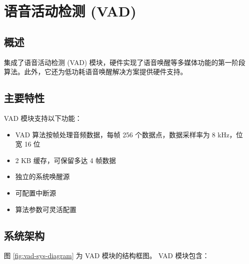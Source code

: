 \documentclass[main\_\_CN.tex]{subfiles}
\begin{document}

\ifglobal
\else
    {\let\clearpage\relax \listoftodos}
    {\let\clearpage\relax \listofdonetodos}
    \tableofcontents
\fi



\hypertarget{vad}{}
\chapter{语音活动检测 (VAD)}
\label{mod:vad}

\section{概述}
\chipname{} 集成了语音活动检测 (VAD) 模块，硬件实现了语音唤醒等多媒体功能的第一阶段算法。此外，它还为低功耗语音唤醒解决方案提供硬件支持。

\section{主要特性}
\label{sec:vad-features}

VAD 模块支持以下功能：

\begin{itemize}
    \item VAD 算法按帧处理音频数据，每帧 256 个数据点，数据采样率为 8 kHz，位宽 16 位
    \item 2 KB 缓存，可保留多达 4 帧数据
    \item 独立的系统唤醒源
    \item 可配置中断源
    \item 算法参数可灵活配置
\end{itemize}




\section{系统架构}
\label{sec:vad-arch-overview}

图 \ref{fig:vad-sys-diagram} 为 \chipname{} VAD 模块的结构框图。\chipname{} VAD 模块包含：
\end{document}
